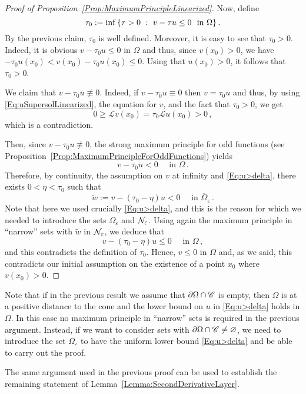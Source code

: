 \begin{proof}[Proof of Proposition~\ref{Prop:MaximumPrincipleLinearized}]
	Now, define 
	$$
	\tau_0:= \inf \left \{ \tau > 0 \ : \ v - \tau u \leq 0 \ \textrm{ in } \Omega \right \}.
	$$
	By the previous claim, $\tau_0$ is well defined. Moreover, it is easy to see that $\tau_0 > 0$. Indeed, it is obvious $v - \tau_0 u \leq 0 $ in $\Omega$ and thus, since $v(x_0)>0$, we have $-\tau_0 u(x_0) < v(x_0) - \tau_0 u (x_0) \leq 0$. Using that $u(x_0)>0$, it follows that  $\tau_0 > 0$.
	
	We claim that $v - \tau_0 u \not \equiv 0$. Indeed, if $v - \tau_0 u \equiv 0$ then $v = \tau_0 u$ and thus, by using \eqref{Eq:uSupersolLinearized}, the equation for $v$, and the fact that $\tau_0 > 0$, we get 
	$$
	0 \geq \mathscr{L} v(x_0) = \tau_0 \mathscr{L} u(x_0) > 0\,, 
	$$
	which is a contradiction.
	
	Then, since $v - \tau_0 u \not \equiv 0$, the strong maximum principle for odd functions (see Proposition~\ref{Prop:MaximumPrincipleForOddFunctions}) yields
	$$
	v - \tau_0 u < 0 \quad \textrm{ in }\Omega\,.
	$$
	Therefore, by continuity, the assumption on $v$ at infinity and \eqref{Eq:u>delta}, there exists $0 < \eta <\tau_0$ such that 
	$$
	\tilde{w} := v - (\tau_0 - \eta) u < 0 \quad \textrm{ in }\overline{\Omega}_\varepsilon\,.
	$$
	Note that here we used crucially \eqref{Eq:u>delta}, and this is the reason for which we needed to introduce the sets $\Omega_\varepsilon$ and $\mathcal{N}_\varepsilon$. Using again the maximum principle in ``narrow'' sets with $\tilde{w}$ in $\mathcal{N}_\varepsilon$, we deduce that 
	$$
	v - (\tau_0 - \eta) u \leq 0 \quad \textrm{ in }\Omega\,,
	$$
	and this contradicts the definition of $\tau_0$. Hence, $v\leq 0$ in $\Omega$ and, as we said, this contradicts our initial assumption on the existence of a point $x_0$ where $v(x_0)>0$.
\end{proof}


Note that if in the previous result we assume that $\partial\Omega \cap \mathscr{C}$ is empty, then $\Omega$ is at a positive distance to the cone and the lower bound on $u$ in \eqref{Eq:u>delta} holds in $\Omega$. In this case no maximum principle in ``narrow'' sets is required in the previous argument. Instead, if we want to consider sets with $\partial\Omega \cap \mathscr{C} \neq \varnothing$, we need to introduce the set $\Omega_\varepsilon$ to have the uniform lower bound \eqref{Eq:u>delta} and be able to carry out the proof.

The same argument used in the previous proof can be used to establish the remaining statement of Lemma~\ref{Lemma:SecondDerivativeLayer}.

